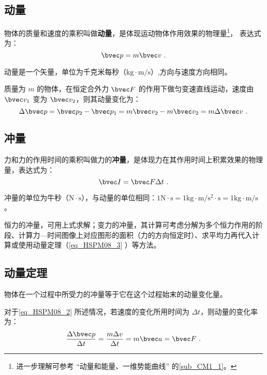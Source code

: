 

\subsection{动量}

物体的质量和速度的乘积叫做\textbf{动量}，是体现运动物体作用效果的物理量\footnote{进一步理解可参考 “动量和能量、一维势能曲线” 的\autoref{sub_CM1_1}。}， 表达式为：
\begin{equation}
\bvec p = m\bvec v~.
\end{equation}

动量是一个矢量，单位为千克米每秒（$\mathrm{kg\cdot m/s}$）,方向与速度方向相同。

质量为 $m$ 的物体，在恒定合外力 $\bvec F $ 的作用下做匀变速直线运动，速度由 $\bvec v_1$ 变为 $\bvec v_2$，则其动量变化为：
\begin{equation}\label{eq_HSPM08_2}
\Delta \bvec p =\bvec p_2 - \bvec p_1 = m\bvec v_2 - m\bvec v_2 = m\Delta \bvec v~.
\end{equation}

\subsection{冲量}

力和力的作用时间的乘积叫做力的\textbf{冲量}，是体现力在其作用时间上积累效果的物理量，表达式为：
\begin{equation}
\bvec I=\bvec F \Delta t~.
\end{equation}

冲量的单位为牛秒（$\mathrm{N\cdot s}$），与动量的单位相同：$1\mathrm{N\cdot s}=1\mathrm{kg\cdot m/s^2 \cdot s}=1\mathrm{kg\cdot m/s}$。

恒力的冲量，可用上式求解；变力的冲量，其计算可考虑分解为多个恒力作用的阶段、计算力—时间图像上对应图形的面积（力的方向恒定时）、求平均力再代入计算或使用动量定理（\autoref{eq_HSPM08_3}  ）等方法。

\subsection{动量定理}

物体在一个过程中所受力的冲量等于它在这个过程始末的动量变化量。

对于\autoref{eq_HSPM08_2} 所述情况，若速度的变化所用时间为 $\Delta t$，则动量的变化率为：
\begin{equation}\label{eq_HSPM08_1}
\frac{\Delta \bvec p}{\Delta t}=\frac{m\Delta v}{\Delta t}=m\bvec a=\bvec F~.
\end{equation}


